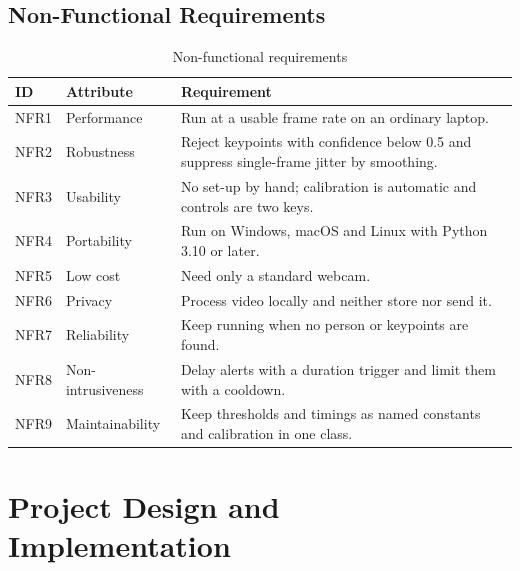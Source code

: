 ﻿\documentclass[12pt,a4paper]{article}
\begin{document}
\subsection{Non-Functional Requirements}
\begin{table}[H]
\centering
\caption{Non-functional requirements}\label{tab:nfr}
\renewcommand{\arraystretch}{1.25}
\begin{tabularx}{\textwidth}{@{}l>{\raggedright\arraybackslash}p{3.2cm}Y@{}}
\toprule
\textbf{ID} & \textbf{Attribute} & \textbf{Requirement}\\
\midrule
NFR1 & Performance & Run at a usable frame rate on an ordinary laptop.\\
NFR2 & Robustness & Reject keypoints with confidence below 0.5 and suppress single-frame jitter by smoothing.\\
NFR3 & Usability & No set-up by hand; calibration is automatic and controls are two keys.\\
NFR4 & Portability & Run on Windows, macOS and Linux with Python 3.10 or later.\\
NFR5 & Low cost & Need only a standard webcam.\\
NFR6 & Privacy & Process video locally and neither store nor send it.\\
NFR7 & Reliability & Keep running when no person or keypoints are found.\\
NFR8 & Non-intrusiveness & Delay alerts with a duration trigger and limit them with a cooldown.\\
NFR9 & Maintainability & Keep thresholds and timings as named constants and calibration in one class.\\
\bottomrule
\end{tabularx}
\end{table}

\clearpage
\section{Project Design and Implementation}
\end{document}
